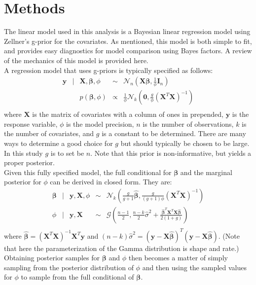 \documentclass{../../tex_template/asaproc}
\newcommand{\p}[1]{\left(#1\right)}
\newcommand{\y}{\bm y}
\newcommand{\X}{\bm X}
\newcommand{\Xb}{\bm {X\beta}}
\newcommand{\bh}{\bm{\hat\beta}}
\newcommand{\XXi}{(\X^T\X)^{-1}}
\begin{document}
\section{Methods}
The linear model used in this analysis is a Bayesian linear regression model
using Zellner's g-prior for the covariates. As mentioned, this model is both
simple to fit, and provides easy diagnostics for model comparison using 
Bayes factors. A review of the mechanics of this model is provided here.\\

A regression model that uses g-priors is typically specified as follows:
\[
  \begin{array}{rclcl}
    \y &|& \X,\bm\beta,\phi &\sim& \mathcal{N}_n\p{\Xb,\frac{1}{\phi}\bm I_n} \\
       && p(\bm\beta,\phi) &\propto& \frac{1}{\phi} \mathcal{N}_k (\bm 0, \frac{g}{\phi} (\X^T\X)^{-1})\\
  \end{array}
\]
where $\X$ is the matrix of covariates with a column of ones in prepended, $\y$
is the response variable, $\phi$ is the model precision, $n$ is the number of
observations, $k$ is the number of covariates, and $g$ is a constant to be
determined. There are many ways to determine a good choice for $g$ but should
typically be chosen to be large. In this study $g$ is to set be $n$. Note that
this prior is non-informative, but yields a proper posterior. \\

Given this fully specified model, the full conditional for $\bm\beta$ and
the marginal posterior for $\phi$ can be derived in closed form. They are:
\[
  \begin{array}{rclcl}
    \bm\beta &|& \y,\X,\phi &\sim& \mathcal{N}_k\p{\frac{g}{g+1}\bh, \frac{g}{(g+1)\phi} \XXi}\\
    \phi &|& \y,\X &\sim& \mathcal{G}\p{\frac{n-1}{2},\frac{n-k}{2}\hat\sigma^2+\frac{\bh^T\X^T\X\bh}{2(1+g)}}\\
  \end{array}
\]
where $\bh = \XXi\X^T\y$ and $(n-k) \hat\sigma^2 = (\y-\X\bh)^T(\y-\X\bh)$. 
(Note that here the parameterization of the Gamma distribution is shape and
rate.) Obtaining posterior samples for $\bm\beta$ and $\phi$ then becomes a
matter of simply sampling from the posterior distribution of $\phi$ and then
using the sampled values for $\phi$ to sample from the full conditional of 
$\bm\beta$. \\
\end{document}
